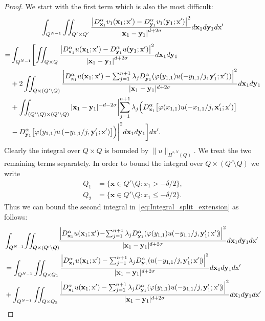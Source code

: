 \documentclass[AHL, Unicode, longabstracts, published]{cedram}
\newcommand\1{{\ensuremath {\mathds 1} }}
\newcommand{\bx}{\mathbf{x}}
\newcommand{\by}{\mathbf{y}}
\newcommand{\sx}{\textup{x}}
\begin{document}
\begin{proof}
We start with the first term which is also the most difficult:
\begin{multline}\label{eq:Integral_split_extension}
\int_{Q^{N-1}} \iint_{Q'\times Q'} \frac{\left|D^\alpha_{\bx_1} v_1(\bx_1;\sx')-D^\alpha_{\by_1} v_1(\by_1; \sx')\right|^2}{\left|\bx_1-\by_1\right|^{d+2\sigma}}d\bx_1 d\by_1 d\sx'\\[5pt]
\begin{aligned}
=&
\int_{Q^{N-1}} \Biggl[
\iint_{Q\times Q} \frac{\left|D^\alpha_{\bx_1} u(\bx_1;\sx')-D^\alpha_{\by_1} u(\by_1; \sx')\right|^2}{\left|\bx_1-\by_1\right|^{d+2\sigma}}d\bx_1 d\by_1\\
& + 2\iint_{Q\times (Q'\setminus Q)} \frac{\left|D^\alpha_{\bx_1} u(\bx_1;\sx')-\sum_{j=1}^{n+1}\lambda_j D^\alpha_{\by_1} (\varphi(y_{1,1}) u(-y_{1,1}/j, \by_1'; \sx'))\right|^2}{|\bx_1-\by_1|^{d+2\sigma}}d\bx_1 d\by_1\\
& +
\iint_{(Q'\setminus Q)\times (Q'\setminus Q)} |\bx_1-\by_1|^{-d-2\sigma}\biggl|\sum_{j=1}^{n+1}\lambda_j \Bigl(D^\alpha_{\bx_1} \bigl[\varphi(x_{1,1}) u(-x_{1,1}/j, \bx_1';\sx')\bigr]\\
& -D^\alpha_{\by_1} \bigl[\varphi(y_{1,1}) u\left(-y_{1,1}/j, \by_1';\sx'\right)\bigr]\Bigr)\biggr|^2 d\bx_1 d\by_1 \biggr]d\sx'.
\end{aligned}
\end{multline}
Clearly the integral over $Q\times Q$ is bounded by $\|u\|_{\dot{H}^{s,N}(Q)}$. We treat the two remaining terms separately. In order to bound the integral over $Q\times (Q'\setminus Q)$ we write
\begin{align*}
Q_1 &=\{\bx\in Q'\setminus Q: x_1>-\delta/2\},\\
Q_2 &=\{\bx\in Q'\setminus Q: x_1\leq-\delta/2\}.
\end{align*}
Thus we can bound the second integral in~\eqref{eq:Integral_split_extension} as follows:
\begin{multline*}
\!\!\int_{Q^{N-1}}\!\iint_{Q\times (Q'\setminus Q)}\!\!\frac{\left|D^\alpha_{\bx_1} u(\bx_1;\sx')\!-\!\sum_{j=1}^{n+1}\lambda_j D^\alpha_{\by_1} (\varphi(y_{1,1}) u(-y_{1,1}/j, \by_1'; \sx')\!)\right|^2}{|\bx_1-\by_1|^{d+2\sigma}}d\bx_1 d\by_1 d\sx'\\
\begin{aligned}
&=
\int_{Q^{N-1}}\iint_{Q\times Q_1} \frac{\left|D^\alpha_{\bx_1} u(\bx_1;\sx')-\sum_{j=1}^{n+1}\lambda_j D^\alpha_{\by_1} (u(-y_{1,1}/j, \by_1'; \sx')\!)\right|^2}{|\bx_1-\by_1|^{d+2\sigma}}d\bx_1 d\by_1 d\sx'\\
&+
\int_{Q^{N-1}}\iint_{Q\times Q_2} \frac{\left|D^\alpha_{\bx_1} u(\bx_1;\sx')-\sum_{j=1}^{n+1}\lambda_j D^\alpha_{\by_1} (\varphi(y_{1,1}) u(-y_{1,1}/j, \by_1'; \sx')\!)\right|^2}{|\bx_1-\by_1|^{d+2\sigma}}d\bx_1 d\by_1 d\sx'\\

\end{aligned}
\end{multline*}
\end{proof}
\end{document}
